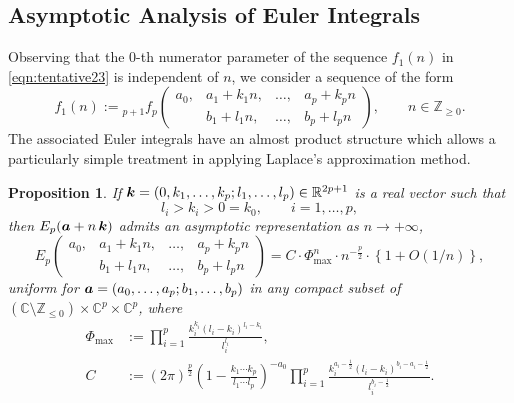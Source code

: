 \documentclass[a4paper,12pt]{article}
\theoremstyle{plain}
\newtheorem{proposition}[theorem]{Proposition}
\def\C{\mathbb{C}}
\def\R{\mathbb{R}}
\def\Z{\mathbb{Z}}
\def\ba{\mbox{\boldmath $a$}}
\def\bk{\mbox{\boldmath $k$}}
\def\Phim{\Phi_{\scriptstyle \mathrm{max}}}
\begin{document}
\subsection{Asymptotic Analysis of Euler Integrals} \label{subsec:aa-ei}
Observing that the $0$-th numerator parameter of the sequence $f_1(n)$ in 
\eqref{eqn:tentative23} is independent of $n$, we consider a sequence of the form 
\[
f_1(n) := {}_{p+1}f_p\begin{pmatrix}
a_0, & a_1 + k_1 n, & \dots, & a_p + k_p n \\[1mm]
     & b_1 + l_1 n, & \dots, & b_p + l_p n 
\end{pmatrix}, \qquad n \in \Z_{\ge 0}.     
\]
The associated Euler integrals have an almost product structure 
which allows a particularly simple treatment in applying 
Laplace's approximation method.  
\begin{proposition} \label{prop:cspm} 
If $\bk = (0, k_1, \dots, k_p; l_1, \dots, l_p) \in \R^{2 p+1}$ is a 
real vector such that 
\begin{equation} \label{eqn:liki}
l_i > k_i > 0 = k_0, \qquad i = 1, \dots, p,  
\end{equation}
then $E_p(\ba + n \, \bk)$ admits an asymptotic representation as 
$n \to +\infty$,  
\begin{equation} \label{eqn:cspm}
E_p\begin{pmatrix}
a_0, & a_1 + k_1 n, & \dots, & a_p + k_p n \\[1mm]
     & b_1 + l_1 n, & \dots, & b_p + l_p n 
\end{pmatrix} 
= C \cdot \Phim^n \cdot n^{- \frac{p}{2} } \cdot \left\{1+ O(1/n) \right\},  
\end{equation}
uniform for $\ba =(a_0, \dots, a_p; b_1, \dots, b_p)$ in any compact 
subset of $(\C \setminus \Z_{\le 0}) \times \C^p \times \C^p$, where 
\begin{subequations} \label{eqn:Phim-C}
\begin{align} 
\Phim &:= \prod_{i=1}^p 
\frac{k_i^{k_i} (l_i - k_i)^{l_i -k_i}}{l_i^{l_i}},  \label{eqn:Phim-C1} \\
C &:= (2 \pi)^{ \frac{p}{2} } 
\left(1- \frac{k_1 \cdots k_p}{l_1 \cdots l_p} \right)^{-a_0} 
\prod_{i=1}^p 
\frac{k_i^{a_i- \frac{1}{2} } 
(l_i - k_i)^{b_i-a_i- \frac{1}{2} }}{l_i^{b_i - \frac{1}{2} }}.  \label{eqn:Phim-C2}
\end{align}
\end{subequations}
\end{proposition}
\end{document}
